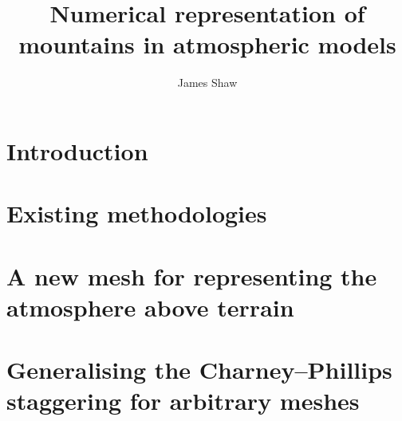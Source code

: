 \documentclass[a4paper,oneside]{memoir}
\title{Numerical representation of mountains in atmospheric models}
\author{James Shaw}
\date{\TODO{date}}
\begin{document}


\frontmatter
\thispagestyle{plain}
\null\vfil
\begin{abstract}
\blindtext
\end{abstract}
\vfil

\cleardoublepage
{\hypersetup{linkcolor=black}\tableofcontents*}

\mainmatter
\chapter{Introduction}
\chapter{Existing methodologies}

\chapter{A new mesh for representing the atmosphere above terrain}
\chapter{Generalising the Charney–Phillips staggering for arbitrary meshes}

\appendixpage
\appendix



\backmatter


\end{document}
